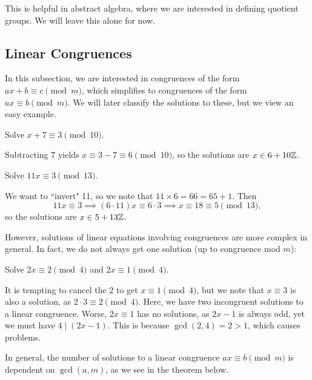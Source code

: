 \documentclass{article}
\begin{document}
This is helpful in abstract algebra, where we are interested in defining quotient groups. We will leave this alone for now.

\subsection*{Linear Congruences}

In this subsection, we are interested in congruences of the form $ax + b\equiv c \pmod m$, which simplifies to congruences of the form $ax \equiv b\pmod m$. We will later classify the solutions to these, but we view an easy example.

\begin{example}
Solve $x+7\equiv 3\pmod{10}$.
\end{example}
\begin{solution}
Subtracting $7$ yields $x \equiv 3-7 \equiv 6\pmod{10}$, so the solutions are $x\in 6 + 10\mathbb Z$.
\end{solution}
\begin{example}
Solve $11x \equiv 3\pmod{13}$.
\end{example}
\begin{solution}
We want to ``invert" 11, so we note that $11\times 6 = 66 = 65+1$. Then
$$11x \equiv 3 \implies (6\cdot 11)x \equiv 6\cdot 3\implies x \equiv 18 \equiv 5\pmod {13},$$
so the solutions are $x\in 5 + 13\mathbb Z$.
\end{solution}

However, solutions of linear equations involving congruences are more complex in general. In fact, we do not always get one solution (up to congruence mod $m$):
\begin{example}
Solve $2x \equiv 2\pmod 4$ and $2x\equiv 1\pmod 4$.
\end{example}
\begin{solution}
It is tempting to cancel the $2$ to get $x\equiv 1\pmod 4$, but we note that $x\equiv 3$ is also a solution, as $2\cdot 3\equiv 2 \pmod 4$. Here, we have two incongruent solutions to a linear congruence. Worse, $2x\equiv 1$ has no solutions, as $2x-1$ is always odd, yet we must have $4\mid (2x-1)$. This is because $\gcd(2,4) = 2 > 1$, which causes problems.
\end{solution}

In general, the number of solutions to a linear congruence $ax\equiv b\pmod m$ is dependent on $\gcd(a, m)$, as we see in the theorem below.
\end{document}
